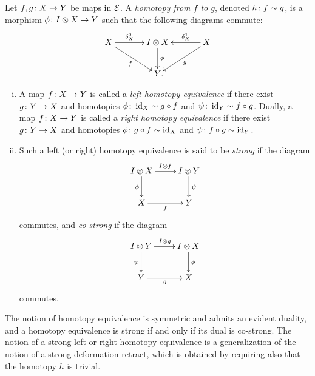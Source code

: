 \documentclass[reqno,10pt,a4paper,oneside,draft]{amsart}
\begin{document}
\begin{definition} \label{def:homotopy}
Let $f, g \colon X \to Y$ be maps in $\mathcal{E}$.
A \emph{homotopy from $f$ to $g$}, denoted $h \colon f \sim g$, is a morphism $\phi \colon I \otimes X \to Y$ such that the following diagrams commute:
\[
\xymatrix@C=1.2cm{
  X \ar[r]^-{\lcyl_X} \ar[dr]_{f} & \interval \otimes X \ar[d]^-{\phi} & X \ar[dl]^{g} \ar[l]_-{\rcyl_X} \\
  & Y \rlap{.} &
}
\]
\end{definition}

\begin{definition} \hfill
\begin{enumerate}[(i)]
\item A map $f \colon X \to Y$ is called a \emph{left homotopy equivalence} if there exist $g \colon Y \to X$ and homotopies $\phi \colon \operatorname{id}_X \sim g \mathbin{\circ} f$ and $\psi \colon \operatorname{id}_Y \sim f \mathbin{\circ} g$.
Dually, a map $f \colon X \to Y$ is called a \emph{right homotopy equivalence} if there exist $g \colon Y \to X$ and homotopies $\phi \colon g \mathbin{\circ} f \sim \operatorname{id}_X $ and $\psi \colon f \mathbin{\circ} g \sim \operatorname{id}_Y$.
\item Such a left (or right) homotopy equivalence is said to be \emph{strong} if the diagram
\[
\xymatrix{
  \interval \otimes X \ar[r]^{\interval \otimes f } \ar[d]_{\phi} & \interval \otimes Y \ar[d]^{\psi} \\
  X \ar[r]_{f} & Y
}
\]
commutes, and \emph{co-strong} if the diagram
\[
  \xymatrix{
  \interval \otimes Y \ar[r]^{\interval \otimes g } \ar[d]_{\psi} & \interval \otimes X \ar[d]^{\phi} \\
  Y \ar[r]_{g} & X
}
\]
commutes.
\end{enumerate}
\end{definition}

The notion of homotopy equivalence is symmetric and admits an evident duality, and a homotopy equivalence is strong if and only if its dual is co-strong.
The notion of a strong left or right homotopy equivalence is a generalization of the notion of a strong deformation retract, which is obtained by requiring also that the homotopy $h$ is trivial.

\medskip
\end{document}
